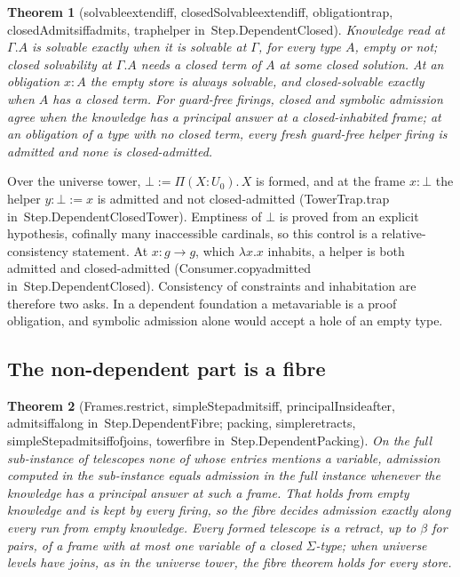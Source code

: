 \documentclass[11pt]{article}
\newtheorem{theorem}{Theorem}
\theoremstyle{remark}
\newcommand{\lean}[1]{{\ttfamily\def\_{\textunderscore\allowbreak}#1}}
\newcommand{\inmod}[1]{in~{\ttfamily\def\_{\textunderscore\allowbreak}#1}}
\begin{document}
\begin{theorem}[\lean{solvable\_extend\_iff}, \lean{closedSolvable\_extend\_iff}, \lean{obligation\_trap}, \lean{closedAdmits\_iff\_admits}, \lean{trap\_helper} \inmod{Step.DependentClosed}]
Knowledge read at $\Gamma.A$ is solvable exactly when it is solvable at $\Gamma$, for every type $A$, empty
or not; closed solvability at $\Gamma.A$ needs a closed term of $A$ at some closed solution. At an
obligation $x : A$ the empty store is always solvable, and closed-solvable exactly when $A$ has a closed
term. For guard-free firings, closed and symbolic admission agree when the knowledge has a principal
answer at a closed-inhabited frame; at an obligation of a type with no closed term, every fresh
guard-free helper firing is admitted and none is closed-admitted.
\end{theorem}

Over the universe tower, $\bot := \Pi(X:U_0).\,X$ is formed, and at the frame $x : \bot$ the helper $y : \bot :=
x$ is admitted and not closed-admitted (\lean{TowerTrap.trap} \inmod{Step.DependentClosedTower}). Emptiness of
$\bot$ is proved from an explicit hypothesis, cofinally many inaccessible cardinals, so this control is a
relative-consistency statement. At $x : g\to g$, which $\lambda x.x$ inhabits, a helper is both admitted
and closed-admitted (\lean{Consumer.copy\_admitted} \inmod{Step.DependentClosed}). Consistency of constraints
and inhabitation are therefore two asks. In a dependent foundation a metavariable is a proof
obligation, and symbolic admission alone would accept a hole of an empty type.

\subsection{The non-dependent part is a fibre}

\begin{theorem}[\lean{Frames.restrict}, \lean{simpleStep\_admits\_iff}, \lean{principalInside\_after}, \lean{admits\_iff\_along} \inmod{Step.DependentFibre}; \lean{packing}, \lean{simple\_retracts}, \lean{simpleStep\_admits\_iff\_of\_joins}, \lean{tower\_fibre} \inmod{Step.DependentPacking}]
On the full sub-instance of telescopes none of whose entries mentions a variable, admission computed in
the sub-instance equals admission in the full instance whenever the knowledge has a principal answer
at such a frame. That holds from empty knowledge and is kept by every firing, so the fibre decides
admission exactly along every run from empty knowledge. Every formed telescope is a retract, up to
$\beta$ for pairs, of a frame with at most one variable of a closed $\Sigma$-type; when universe levels
have joins, as in the universe tower, the fibre theorem holds for every store.
\end{theorem}
\end{document}
